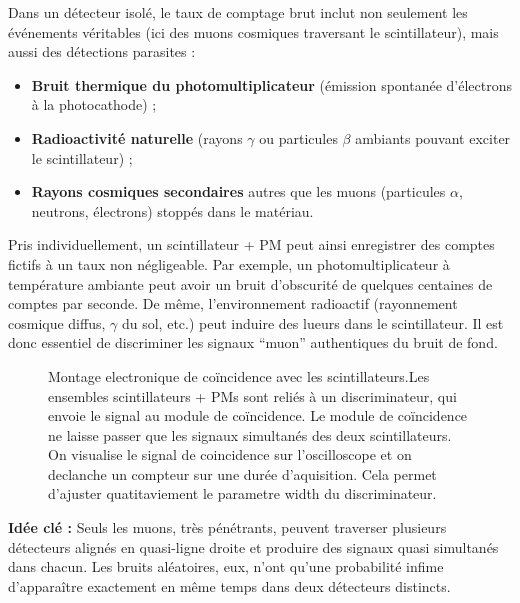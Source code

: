 \documentclass[a4paper,12pt,twoside]{article}
\begin{document}
Dans un détecteur isolé, le taux de comptage brut inclut non seulement les événements véritables (ici des muons cosmiques traversant le scintillateur), mais aussi des détections parasites :
\begin{itemize}
    \item \textbf{Bruit thermique du photomultiplicateur} (émission spontanée d’électrons à la photocathode) ;
    \item \textbf{Radioactivité naturelle} (rayons $\gamma$ ou particules $\beta$ ambiants pouvant exciter le scintillateur) ;
    \item \textbf{Rayons cosmiques secondaires} autres que les muons (particules $\alpha$, neutrons, électrons) stoppés dans le matériau.
\end{itemize}

Pris individuellement, un scintillateur + PM peut ainsi enregistrer des comptes fictifs à un taux non négligeable. Par exemple, un photomultiplicateur à température ambiante peut avoir un bruit d’obscurité de quelques centaines de comptes par seconde. De même, l’environnement radioactif (rayonnement cosmique diffus, $\gamma$ du sol, etc.) peut induire des lueurs dans le scintillateur. Il est donc essentiel de discriminer les signaux “muon” authentiques du bruit de fond.

\begin{figure}[H]
    \centering
    
    \caption{Montage electronique de coïncidence avec les scintillateurs.Les ensembles scintillateurs + PMs sont reliés à un discriminateur, qui envoie le signal au module de coïncidence. Le module de coïncidence ne laisse passer que les signaux simultanés des deux scintillateurs. On visualise le signal de coincidence sur l'oscilloscope et on declanche un compteur sur une durée d'aquisition. Cela permet d'ajuster quatitaviement le parametre width du discriminateur.}
    \label{fig:coincidence_sans_delais}
\end{figure}

\vspace{1em}
\begin{center}
\begin{tcolorbox}[colback=blue!5!white, colframe=blue!60!black, title=Principe de la coïncidence]
\textbf{Idée clé :} Seuls les muons, très pénétrants, peuvent traverser plusieurs détecteurs alignés en quasi-ligne droite et produire des signaux quasi simultanés dans chacun. Les bruits aléatoires, eux, n’ont qu’une probabilité infime d’apparaître exactement en même temps dans deux détecteurs distincts.
\end{tcolorbox}
\end{center}
\end{document}
